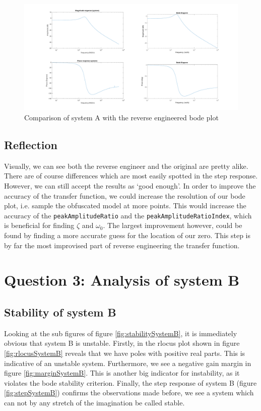 \documentclass[a4paper,kul]{kulakarticle} %
\newcommand{\matlab}[1]{\lstinline[style=Matlab-editor]!#1!}
\begin{document}
			\begin{figure}[h]
				\centering
				\includegraphics[width=1\linewidth]{BodeCompare}
				\caption[Comparing bode plots]{Comparison of system A with the reverse engineered bode plot}
				\label{fig:BodeCompared}
			\end{figure}
			
		\newpage
		\subsection{Reflection}
			Visually, we can see both the reverse engineer and the original are pretty alike. There are of course differences which are most easily spotted in the step response. However, we can still accept the results as `good enough'. In order to improve the accuracy of the transfer function, we could increase the resolution of our bode plot, i.e. sample the obfuscated model at more points. This would increase the accuracy of the \matlab{peakAmplitudeRatio} and the \matlab{peakAmplitudeRatioIndex}, which is beneficial for finding $\zeta$ and $\omega_0$.  The largest improvement however, could be found by finding a more accurate guess for the location of our zero. This step is by far the most improvised part of reverse engineering the transfer function.
	\newpage
	\section{Question 3: Analysis of system B}
		\subsection{Stability of system B}
			Looking at the sub figures of figure \ref{fig:stabilitySystemB}, it is immediately  obvious that system B is unstable. Firstly, in the rlocus plot shown in figure \ref{fig:rlocusSystemB} reveals that we have poles with positive real parts. This is indicative of an unstable system. Furthermore, we see a negative gain margin in figure \ref{fig:marginSystemB}. This is another big indicator for instability, as it violates the bode stability criterion. Finally, the step response of system B (figure \ref{fig:stepSystemB}) confirms the observations made before, we see a system which can not by any stretch of the imagination be called stable.  
	
\end{document}
